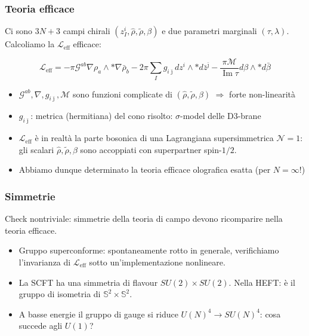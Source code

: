 \documentclass[aspectratio=43,mathserif]{beamer}
\newcommand{\ess}{\mathbb{S}}
\newcommand{\ssn}{\mathcal{N}}
\newcommand{\hatt}[1]{\ensuremath{\widehat{#1}}}
\newcommand{\tildd}[1]{\ensuremath{\widetilde{#1}}}
\newcommand{\hodge}{\ensuremath{*}}
\renewcommand{\Im}{\ensuremath{\operatorname{Im}}}
\newcommand{\leff}{\ensuremath{\mathcal{L}_\text{eff}}}
\begin{document}
\begin{frame}
	\frametitle{Teoria efficace}
	Ci sono $3N+3$ campi chirali $(z_I^i, \hatt\rho, \tildd\rho, \beta)$ e due parametri marginali $(\tau,\lambda)$. Calcoliamo la $\leff$ efficace:

	\begin{equation}
		\leff = - \pi \mathcal{G}^{ab} \nabla \rho_a \wedge \hodge \nabla \bar\rho_b - 2\pi \sum_I g_{i\bar\jmath} dz^i \wedge \hodge d\bar z^{\bar\jmath} - \frac{\pi\mathcal{M}}{\Im \tau} d\beta \wedge \hodge d\bar \beta
		\label{}
	\end{equation}

	\begin{itemize}
		\item $\mathcal{G}^{ab},\nabla,g_{i\bar\jmath},\mathcal{M}$ sono funzioni complicate di $(\hatt\rho,\tildd\rho,\beta)$ $\Longrightarrow$ forte non-linearità
		\item $g_{i\bar\jmath}$: metrica (hermitiana) del cono risolto: $\sigma$-model delle D3-brane
		\item $\leff$ è in realtà la parte bosonica di una Lagrangiana supersimmetrica $\ssn=1$: gli scalari $\hatt\rho,\tildd\rho,\beta$ sono accoppiati con superpartner spin-$1/2$.
		\item Abbiamo dunque determinato la teoria efficace olografica esatta (per $N = \infty$!)
	\end{itemize}



\end{frame}


\begin{frame}
	\frametitle{Simmetrie}
	Check nontriviale: simmetrie della teoria di campo devono ricomparire nella teoria efficace. 
	\begin{itemize}
		\vfill\item Gruppo superconforme: spontaneamente rotto in generale, verifichiamo l'invarianza di $\leff$ sotto un'implementazione nonlineare.
		\vfill\item La SCFT ha una simmetria di flavour $SU(2)\times SU(2)$. Nella HEFT: è il gruppo di isometria di $\ess^2 \times \ess^2$.
		\vfill\item A basse energie il gruppo di gauge si riduce $U(N)^4 \rightarrow SU(N)^4$: cosa succede agli $U(1)$?
	\end{itemize}
\end{frame}
\end{document}
